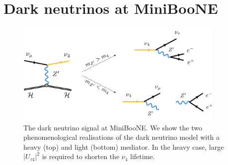 %

\section{Dark neutrinos at MiniBooNE}

\begin{figure}[t!]
    \centering
    \includegraphics[width=0.9\textwidth]{Dark_neutrinos.pdf}
    \caption[Dark neutrino signal at MiniBooNE.]{The dark neutrino signal at MiniBooNE. We show the two phenomenological realisations of the dark neutrino model with a heavy (top) and light (bottom) mediator. In the heavy case, large $|U_{\tau4}|^2$ is required to shorten the $\nu_4$ lifetime.\label{fig:diagram}}
\end{figure}

